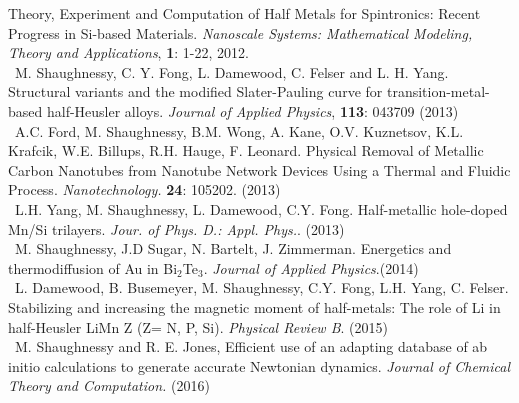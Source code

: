 \documentclass[11pt, a4paper]{article}
\newcommand{\years}[1]{\marginnote{\scriptsize #1}}
\begin{document}
{Theory, Experiment and Computation of Half Metals for Spintronics: Recent Progress in Si-based Materials.} \emph{Nanoscale Systems: Mathematical Modeling, Theory and Applications},  \textbf{1}: 1-22,  2012. \\
\years{2013} \   M. Shaughnessy, C. Y. Fong, L. Damewood, C. Felser and L. H. Yang. %
{Structural variants and the modified Slater-Pauling curve for transition-metal-based half-Heusler alloys.} \emph{Journal of Applied Physics}, \textbf{113}: 043709 (2013) \\
\years{    } \   A.C. Ford, M. Shaughnessy, B.M. Wong, A. Kane, O.V. Kuznetsov, K.L. Krafcik, W.E. Billups, R.H. Hauge, F. Leonard. %
{Physical Removal of Metallic Carbon Nanotubes from Nanotube Network Devices Using a Thermal and Fluidic Process.} \emph{Nanotechnology.} \textbf{24}: 105202. (2013) \\
\years{    } \    L.H. Yang, M. Shaughnessy, L. Damewood, C.Y. Fong. %
{Half-metallic hole-doped Mn/Si trilayers.} 
\emph{Jour. of Phys. D.: Appl. Phys.}. (2013)\\
\years{2014} \   M. Shaughnessy, J.D Sugar, N. Bartelt, J. Zimmerman. {Energetics and thermodiffusion of Au in Bi$_2$Te$_3$.} \emph{Journal of Applied Physics}.(2014)\\
\years{2015} \  L. Damewood, B. Busemeyer, M. Shaughnessy, C.Y. Fong, L.H. Yang, C. Felser. {Stabilizing and increasing the magnetic moment of half-metals: The role of Li in half-Heusler LiMn Z (Z= N, P, Si)}. \emph{Physical Review B}. (2015)\\
\years{2016} \  M. Shaughnessy and R. E. Jones, {Efficient use of an adapting database of ab initio calculations to generate accurate Newtonian dynamics}.  \emph{Journal of Chemical Theory and Computation.} (2016)

\end{document}

